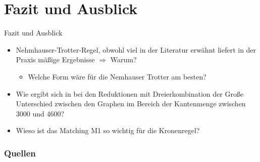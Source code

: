 \documentclass{beamer}
\begin{document}
\section{Fazit und Ausblick}
\begin{frame}{Fazit und Ausblick}
\begin{itemize}
\item Nehmhauser-Trotter-Regel, obwohl viel in der Literatur erwähnt liefert in der Praxis mäßige Ergebnisse $\Rightarrow$ Warum? 
	 \begin{itemize}
	\item Welche Form wäre für die Nemhauser Trotter am besten? 
	\end{itemize}
\item Wie ergibt sich in bei den Reduktionen mit Dreierkombination der Große Unterschied zwischen den Graphen im Bereich der Kantenmenge zwischen 3000 und 4600? 
\item Wieso ist das Matching M1 so wichtig für die Kronenregel? 
\end{itemize}
\end{frame}
  \begin{frame}[allowframebreaks]
        \frametitle{Quellen}

        
\end{frame}
\end{document}
